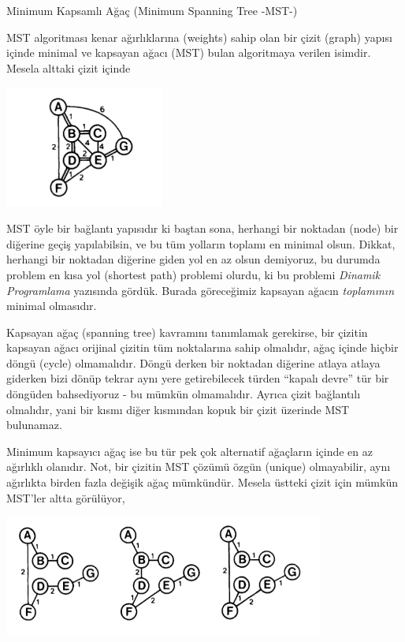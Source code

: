 \documentclass[12pt,fleqn]{article}\usepackage{../../common}
\begin{document}
Minimum Kapsamlı Ağaç (Minimum Spanning Tree -MST-)

MST algoritması kenar ağırlıklarına (weights) sahip olan bir çizit (graph)
yapısı içinde minimal ve kapsayan ağacı (MST) bulan algoritmaya verilen
isimdir. Mesela alttaki çizit içinde

\includegraphics[height=4cm]{minspan_0.png}

MST öyle bir bağlantı yapısıdır ki baştan sona, herhangi bir noktadan
(node) bir diğerine geçiş yapılabilsin, ve bu tüm yolların toplamı en
minimal olsun. Dikkat, herhangi bir noktadan diğerine giden yol en az olsun
demiyoruz, bu durumda problem en kısa yol (shortest path) problemi
olurdu, ki bu problemi {\em Dinamik Programlama} yazısında gördük. Burada
göreceğimiz kapsayan ağacın {\em toplamının} minimal olmasıdır. 

Kapsayan ağaç (spanning tree) kavramını tanımlamak gerekirse, bir çizitin
kapsayan ağacı orijinal çizitin tüm noktalarına sahip olmalıdır, ağaç
içinde hiçbir döngü (cycle) olmamalıdır. Döngü derken bir noktadan diğerine
atlaya atlaya giderken bizi dönüp tekrar aynı yere getirebilecek türden
``kapalı devre'' tür bir döngüden bahsediyoruz - bu mümkün
olmamalıdır. Ayrıca çizit bağlantılı olmalıdır, yani bir kısmı diğer
kısmından kopuk bir çizit üzerinde MST bulunamaz. 

Minimum kapsayıcı ağaç ise bu tür pek çok alternatif ağaçların içinde en az
ağırlıklı olanıdır. Not, bir çizitin MST çözümü özgün (unique) olmayabilir, aynı
ağırlıkta birden fazla değişik ağaç mümkündür. Mesela üstteki çizit için mümkün
MST'ler altta görülüyor,

\includegraphics[height=4cm]{minspan_1.png}
\end{document}
